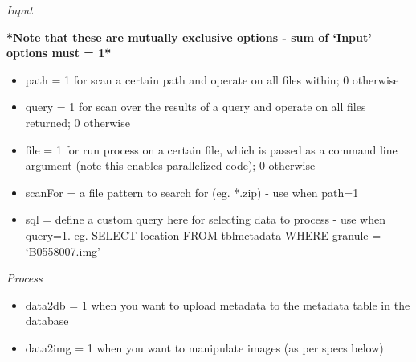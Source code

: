 \documentclass[letterpaper,10pt,openany,oneside]{sphinxmanual}
\begin{document}
\emph{Input}

\textbf{*Note that these are mutually exclusive options - sum of `Input'
options must = 1*}
\begin{itemize}
\item {} 
path = 1 for scan a certain path and operate on all files within; 0
otherwise

\item {} 
query = 1 for scan over the results of a query and operate on all
files returned; 0 otherwise

\item {} 
file = 1 for run process on a certain file, which is passed as a
command line argument (note this enables parallelized code); 0
otherwise

\item {} 
scanFor = a file pattern to search for (eg. *.zip) - use when path=1

\item {} 
sql = define a custom query here for selecting data to process - use
when query=1. eg. SELECT location FROM tblmetadata WHERE granule =
`B0558007.img'

\end{itemize}

\emph{Process}
\begin{itemize}
\item {} 
data2db = 1 when you want to upload metadata to the metadata table in
the database

\item {} 
data2img = 1 when you want to manipulate images (as per specs below)

\end{itemize}
\end{document}
